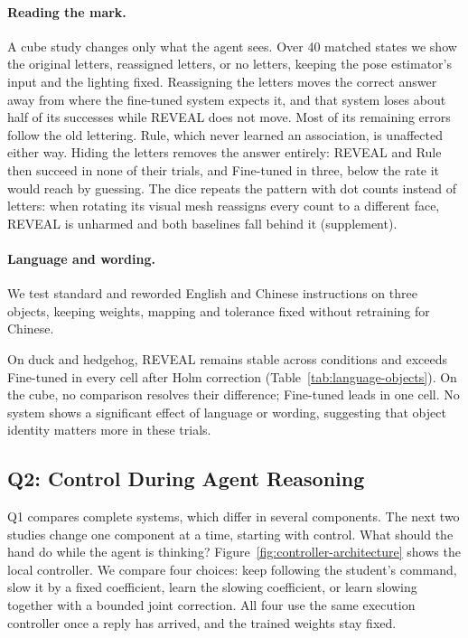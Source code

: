 \paragraph{Reading the mark.}
A cube study changes only what the agent sees. Over 40 matched states we show the original letters, reassigned letters, or no letters, keeping the pose estimator's input and the lighting fixed. Reassigning the letters moves the correct answer away from where the fine-tuned system expects it, and that system loses about half of its successes while REVEAL does not move. Most of its remaining errors follow the old lettering. Rule, which never learned an association, is unaffected either way. Hiding the letters removes the answer entirely: REVEAL and Rule then succeed in none of their trials, and Fine-tuned in three, below the rate it would reach by guessing. The dice repeats the pattern with dot counts instead of letters: when rotating its visual mesh reassigns every count to a different face, REVEAL is unharmed and both baselines fall behind it (supplement).

\paragraph{Language and wording.}
We test standard and reworded English and Chinese instructions on three objects, keeping weights, mapping and tolerance fixed without retraining for Chinese.

\begingroup

\endgroup

On duck and hedgehog, REVEAL remains stable across conditions and exceeds Fine-tuned in every cell after Holm correction (Table~\ref{tab:language-objects}). On the cube, no comparison resolves their difference; Fine-tuned leads in one cell. No system shows a significant effect of language or wording, suggesting that object identity matters more in these trials.

\subsection{Q2: Control During Agent Reasoning}


Q1 compares complete systems, which differ in several components. The next two studies change one component at a time, starting with control. What should the hand do while the agent is thinking? Figure~\ref{fig:controller-architecture} shows the local controller. We compare four choices: keep following the student's command, slow it by a fixed coefficient, learn the slowing coefficient, or learn slowing together with a bounded joint correction. All four use the same execution controller once a reply has arrived, and the trained weights stay fixed.

